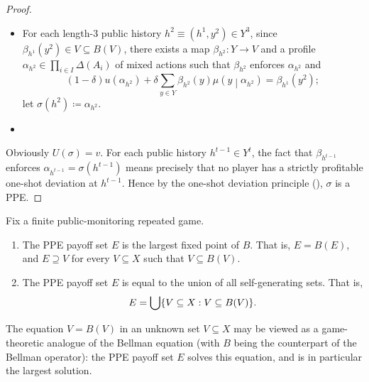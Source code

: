 \begin{proof}
\begin{itemize}
		\item For each length-$3$ public history $h^2 \equiv \left(h^1,y^2\right) \in Y^3$, since $\beta_{h^1}\left( y^2 \right) \in V \subseteq B(V)$, there exists a map $\beta_{h^2} : Y \to V$ and a profile $\alpha_{h^2} \in \prod_{i \in I} \Delta(A_i)$ of mixed actions such that $\beta_{h^2}$ enforces $\alpha_{h^2}$ and
		\begin{equation*}
			(1-\delta) u\left(\alpha_{h^2}\right)
			+ \delta \sum_{y \in Y} \beta_{h^2}(y) \mu\left(y\middle|\alpha_{h^2}\right) 
			= \beta_{h^1}\left( y^2 \right) ;
		\end{equation*}
		let $\sigma\left( h^2 \right) \coloneqq \alpha_{h^2}$.

		\item[\vdots]
	
	\end{itemize}
	Obviously $U(\sigma) = v$. For each public history $h^{t-1} \in Y^t$, the fact that $\beta_{h^{t-1}}$ enforces $\alpha_{h^{t-1}} = \sigma\left( h^{t-1} \right)$ means precisely that no player has a strictly profitable one-shot deviation at $h^{t-1}$. Hence by the one-shot deviation principle (), $\sigma$ is a PPE.
\end{proof}

\begin{theorem}
	\label{theorem:self-gen_max_ppe}
	Fix a finite public-monitoring repeated game.

	\begin{enumerate}[label=(\alph*)]

		\item The PPE payoff set $E$ is the largest fixed point of $B$. That is, $E = B(E)$, and $E \supseteq V$ for every $V \subseteq X$ such that $V \subseteq B(V)$.
	
		\item The PPE payoff set $E$ is equal to the union of all self-generating sets. That is,
		\begin{equation*}
			E = \Union \left\{ V \subseteq X : V \subseteq B(V) \right\} .
		\end{equation*}
	
	\end{enumerate}
\end{theorem}

The equation $V = B(V)$ in an unknown set $V \subseteq X$ may be viewed as a game-theoretic analogue of the Bellman equation (with $B$ being the counterpart of the Bellman operator): the PPE payoff set $E$ solves this equation, and is in particular the largest solution. 

